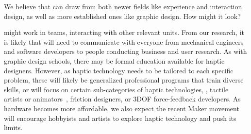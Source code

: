 We believe that \haxd can draw from both newer fields like experience and interaction design, as well as more established ones like graphic design.
How might it look?

 might work in teams, interacting with other relevant units.
From our research, it is likely that  will need to %
 communicate with  everyone from mechanical engineers and software developers to people conducting business and user research.
As with graphic design schools, there may be formal education available for haptic designers.
However, as haptic technology needs to be tailored to each specific problem, these will likely be generalized professional programs that train diverse skills, or will focus on certain sub-categories of haptic technologies, \eg, tactile artists or animators~\citep{Schneider2015}, friction designers, or 3DOF force-feedback developers.
As hardware becomes more affordable, we also expect the recent Maker movement will encourage hobbyists and artists to explore haptic technology and push its limits. %

